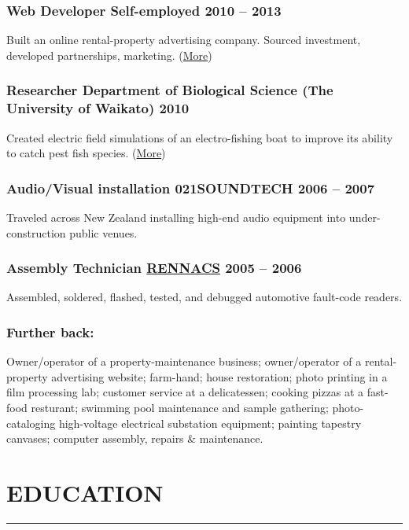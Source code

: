 \documentclass[english]{extarticle}
\newcommand{\mySect}[2]{
    \section*{\textcolor{secondary}{#1}\hfill{\footnotesize\textmd{{#2}}}}
    \vspace{-2em}
    \textcolor{tertiary}{\hrule}
    \vspace{0.5em}
}
\begin{document}
\subsubsection*{Web Developer \textmd{\footnotesize Self-employed \hfill{} \textbf{2010 -- 2013}}}
\vspace{-2mm}
Built an online rental-property advertising company. Sourced investment, developed partnerships, marketing. (\href{https://markhedleyjones.com/projects/houser}{More})

\subsubsection*{Researcher \textmd{\footnotesize Department of Biological Science (The University of Waikato) \hfill{} \textbf{2010}}}
\vspace{-2mm}
Created electric field simulations of an electro-fishing boat to improve its ability to catch pest fish species. (\href{https://researchcommons.waikato.ac.nz/bitstream/handle/10289/11289/Use%20of%20Electrofishing.pdf}{More})

\subsubsection*{Audio/Visual installation \textmd{\footnotesize 021SOUNDTECH \hfill{} \textbf{2006 -- 2007}}}
\vspace{-2mm}
Traveled across New Zealand installing high-end audio equipment into under-construction public venues.

\subsubsection*{Assembly Technician \textmd{\footnotesize \href{https://rennacs.com/}{RENNACS} \hfill{} \textbf{2005 -- 2006}}}
\vspace{-2mm}
Assembled, soldered, flashed, tested, and debugged automotive fault-code readers.

\subsubsection*{Further back:}
Owner/operator of a property-maintenance business;
owner/operator of a rental-property advertising website;
farm-hand;
house restoration;
photo printing in a film processing lab;
customer service at a delicatessen;
cooking pizzas at a fast-food resturant;
swimming pool maintenance and sample gathering;
photo-cataloging high-voltage electrical substation equipment;
painting tapestry canvases;
computer assembly, repairs \& maintenance.
\mySect{EDUCATION}{}
\end{document}
